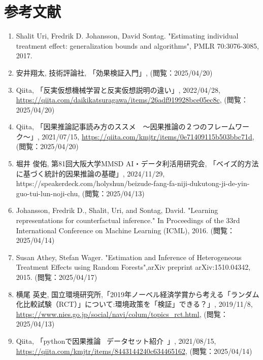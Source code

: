 \documentclass[dvipdfmx]{jreport}
\begin{document}
\section{参考文献}
\begin{enumerate}
    \renewcommand{\labelenumi}{[\theenumi]}
    \item \label{元論} Shalit Uri, Fredrik D. Johansson, David Sontag. "Estimating individual treatment effect: generalization bounds and algorithms", PMLR 70:3076-3085, 2017.
    \item \label{因果推論} 安井翔太, 技術評論社, 「効果検証入門」, (閲覧：2025/04/20)
    \item \label{反実仮想} Qiita, 「反実仮想機械学習と反実仮想説明の違い」, 2022/04/28, \url{https://qiita.com/daikikatsuragawa/items/26adf919928bce05ec8c}, (閲覧：2025/04/20)
    \item \label{ルービン} Qiita, 「因果推論記事読み方のススメ　〜因果推論の２つのフレームワーク〜」, 2021/07/15, \url{https://qiita.com/kmjtr/items/0e71409115b503bbc71d}, (閲覧：2025/04/20)
    \item \label{データ科学} 堀井 俊佑, 第81回大阪大学MMSD AI・データ利活用研究会, 「ベイズ的方法に基づく統計的因果推論の基礎」, 2024/11/29, https://speakerdeck.com/holyshun/beizude-fang-fa-niji-dukutong-ji-de-yin-guo-tui-lun-noji-chu, (閲覧：2025/04/13)
    \item \label{bnn}Johansson, Fredrik D., Shalit, Uri, and Sontag, David. "Learning representations for counterfactual inference." In Proceedings of the 33rd International Conference on Machine Learning (ICML), 2016.  (閲覧：2025/04/14)
    \item \label{因果フォレスト} Susan Athey, Stefan Wager. "Estimation and Inference of Heterogeneous Treatment Effects using Random Forests",arXiv preprint arXiv:1510.04342, 2015. (閲覧：2025/04/17)
    \item \label{rct} 横尾 英史, 国立環境研究所,「2019年ノーベル経済学賞から考える「ランダム化比較試験（RCT）」について:環境政策を「検証」できる？」, 2019/11/8, \url{https://www.nies.go.jp/social/navi/colum/topics_rct.html}, (閲覧：2025/04/13)
    \item \label{data}Qiita, 「pythonで因果推論 ~データセット紹介~」, 2021/08/15, \url{https://qiita.com/kmjtr/items/8443144240c634465162}, (閲覧：2025/04/14)
\end{enumerate}
\end{document}
